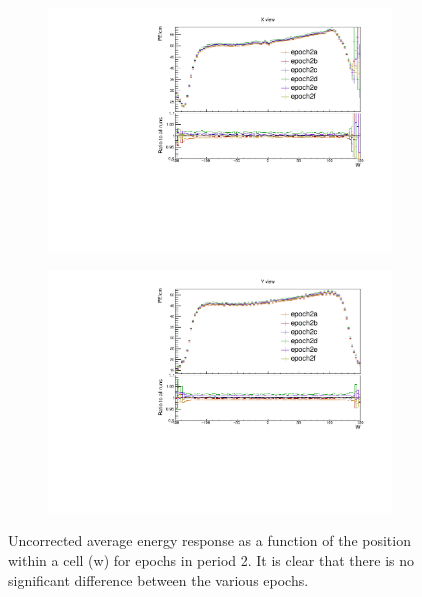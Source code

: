 \documentclass[12pt,a4paper]{article}
\begin{document}
\begin{figure}[!hbtp]
\centering
\begin{subfigure}[b]{0.495\textwidth}
\centering
\includegraphics[width=\textwidth]{Plots/Attenprofs_P2Data_WPE_corr_xy_X_Combined.pdf}
\end{subfigure}
\begin{subfigure}[b]{0.495\textwidth}
\centering
\includegraphics[width=\textwidth]{Plots/Attenprofs_P2Data_WPE_corr_xy_Y_Combined.pdf}
\end{subfigure}
\caption{Uncorrected average energy response as a function of the position within a cell (w) for epochs in period 2. It is clear that there is no significant difference between the various epochs.}
\label{figCalibhistWPE_period2}
\end{figure}
\end{document}
